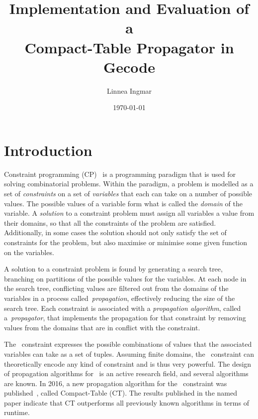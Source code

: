 \documentclass[a4paper,11pt]{article}
\title{\textbf{Implementation and Evaluation of a\\
    Compact-Table Propagator in Gecode
  }
}
\author{Linnea Ingmar} %
\date{\today}
\newcommand{\Table}{\Constraint{Table}}
\newcommand{\CTpaper}[0]{DBLP:conf/cp/DemeulenaereHLP16}
\numberwithin{equation}{section}
\begin{document}
\maketitle

\tableofcontents

\newpage

\section{Introduction}
\label{intro}


Constraint programming (CP)~\cite{Apt:constraintsBook}
is a programming paradigm that is used for solving
combinatorial problems. Within the paradigm, a problem is
modelled as a set of \emph{constraints} on a
set of \emph{variables} that each can take on a number of
possible values. The possible values of 
a variable form what is called the \emph{domain} of the variable.
A \emph{solution} to a constraint problem must assign all variables
a value from their domains, so that all the constraints of the problem
are satisfied. Additionally, in some cases the solution should not only
satisfy the set of constraints for the
problem, but also maximise or minimise some given function on the variables.


A solution to a constraint problem is found by generating a search
tree, branching on partitions of the possible values for the variables. 
At each node in the search tree, conflicting values are filtered out
from the domains of the variables in a process called~\emph{propagation},
effectively reducing the size of the search tree.
Each constraint is associated with a \emph{propagation algorithm},
called a~\emph{propagator},
that implements the propagation for that constraint by removing
values from the domains that are in conflict with the constraint.

The \Table~constraint expresses the possible combinations of values
that the associated variables can take as a set of tuples.
Assuming finite domains, the \Table~constraint can theoretically
encode any kind of constraint and is thus very powerful. 
The design of propagation algorithms for \Table~is an active research field,
and several algorithms are known. In 2016, a new propagation algorithm for the
\Table~constraint was published~\cite{\CTpaper}, called Compact-Table (CT).
The results published in the named paper indicate that CT outperforms all previously
known algorithms in terms of runtime.
\end{document}
